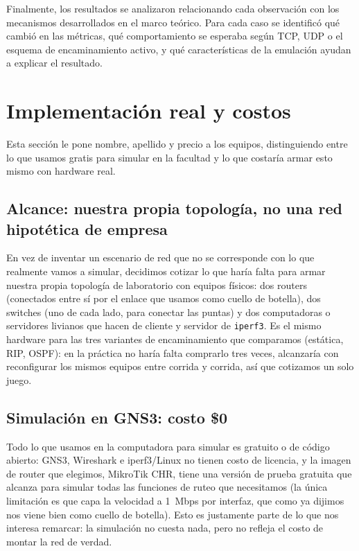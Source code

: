 \documentclass[11pt,a4paper]{article}
\begin{document}
Finalmente, los resultados se analizaron relacionando cada observaci\'on con los mecanismos desarrollados en el marco te\'orico. Para cada caso se identific\'o qu\'e cambi\'o en las m\'etricas, qu\'e comportamiento se esperaba seg\'un TCP, UDP o el esquema de encaminamiento activo, y qu\'e caracter\'isticas de la emulaci\'on ayudan a explicar el resultado.

\clearpage
\section{Implementaci\'on real y costos}
\label{sec:costos}

Esta secci\'on le pone nombre, apellido y precio a los equipos, distinguiendo entre lo que usamos gratis para simular en la facultad y lo que costar\'ia armar esto mismo con hardware real.

\subsection*{Alcance: nuestra propia topolog\'ia, no una red hipot\'etica de empresa}

En vez de inventar un escenario de red que no se corresponde con lo que realmente vamos a simular, decidimos cotizar lo que har\'ia falta para armar nuestra propia topolog\'ia de laboratorio con equipos f\'isicos: dos routers (conectados entre s\'i por el enlace que usamos como cuello de botella), dos switches (uno de cada lado, para conectar las puntas) y dos computadoras o servidores livianos que hacen de cliente y servidor de \texttt{iperf3}. Es el mismo hardware para las tres variantes de encaminamiento que comparamos (est\'atica, RIP, OSPF): en la pr\'actica no har\'ia falta comprarlo tres veces, alcanzar\'ia con reconfigurar los mismos equipos entre corrida y corrida, as\'i que cotizamos un solo juego.

\subsection*{Simulaci\'on en GNS3: costo \$0}

Todo lo que usamos en la computadora para simular es gratuito o de c\'odigo abierto: GNS3, Wireshark e iperf3/Linux no tienen costo de licencia, y la imagen de router que elegimos, MikroTik CHR, tiene una versi\'on de prueba gratuita que alcanza para simular todas las funciones de ruteo que necesitamos (la \'unica limitaci\'on es que capa la velocidad a 1~Mbps por interfaz, que como ya dijimos nos viene bien como cuello de botella). Esto es justamente parte de lo que nos interesa remarcar: la simulaci\'on no cuesta nada, pero no refleja el costo de montar la red de verdad.
\end{document}
